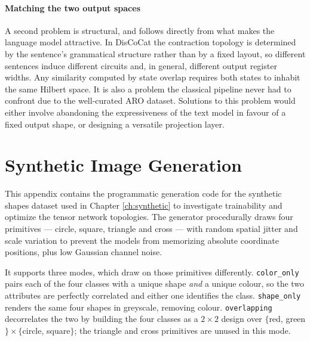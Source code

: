 \documentclass[12pt, a4paper, oneside]{report}
\begin{document}
\subsubsection{Matching the two output spaces}
A second problem is structural, and follows directly from what makes the language model attractive. In DisCoCat the contraction topology is determined by the sentence's grammatical structure rather than by a fixed layout, so different sentences induce different circuits and, in general, different output register widths. Any similarity computed by state overlap requires both states to inhabit the same Hilbert space. It is also a problem the classical pipeline never had to confront due to the well-curated ARO dataset. Solutions to this problem would either involve abandoning the expressiveness of the text model in favour of a fixed output shape, or designing a versatile projection layer.

\newpage



\newpage
\appendix
\chapter{Synthetic Image Generation}

\label{appendix:synthetic_data}
This appendix contains the programmatic generation code for the synthetic shapes dataset used in Chapter \ref{ch:synthetic} to investigate trainability and optimize the tensor network topologies. The generator procedurally draws four primitives --- circle, square, triangle and cross --- with random spatial jitter and scale variation to prevent the models from memorizing absolute coordinate positions, plus low Gaussian channel noise.

It supports three modes, which draw on those primitives differently. \texttt{color\_only} pairs each of the four classes with a unique shape \textit{and} a unique colour, so the two attributes are perfectly correlated and either one identifies the class. \texttt{shape\_only} renders the same four shapes in greyscale, removing colour. \texttt{overlapping} decorrelates the two by building the four classes as a $2 \times 2$ design over $\{$red, green$\}\times\{$circle, square$\}$; the triangle and cross primitives are unused in this mode.
\end{document}
